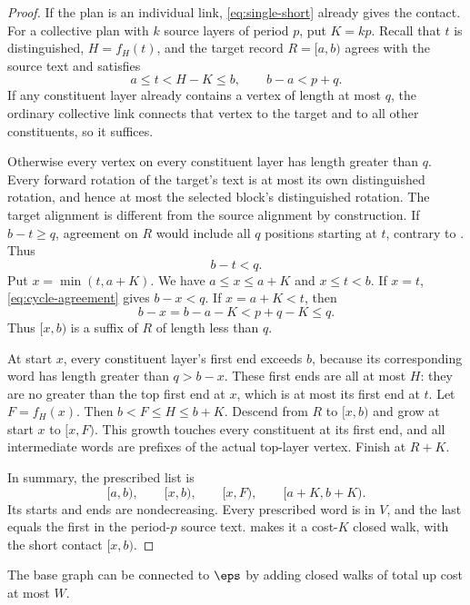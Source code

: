 \begin{proof}
If the plan is an individual link, \eqref{eq:single-short} already gives the contact. For a collective plan with $k$ source layers of period $p$, put $K=kp$. Recall that $t$ is distinguished, $H=f_H(t)$, and the target record $R=[a,b)$ agrees with the source text and satisfies
\[
a\le t<H-K\le b,\qquad b-a<p+q.
\]
If any constituent layer already contains a vertex of length at most $q$, the ordinary collective link connects that vertex to the target and to all other constituents, so it suffices.

Otherwise every vertex on every constituent layer has length greater than $q$. Every forward rotation of the target's text is at most its own distinguished rotation, and hence at most the selected block's distinguished rotation. The target alignment is different from the source alignment by construction. If $b-t\ge q$, agreement on $R$ would include all $q$ positions starting at $t$, contrary to . Thus
\begin{equation}\label{eq:cycle-agreement}
b-t<q.
\end{equation}
Put $x=\min(t,a+K)$. We have $a\le x\le a+K$ and $x\le t<b$. If $x=t$, \eqref{eq:cycle-agreement} gives $b-x<q$. If $x=a+K<t$, then
\[
b-x=b-a-K<p+q-K\le q.
\]
Thus $[x,b)$ is a suffix of $R$ of length less than $q$.

At start $x$, every constituent layer's first end exceeds $b$, because its corresponding word has length greater than $q>b-x$. These first ends are all at most $H$: they are no greater than the top first end at $x$, which is at most its first end at $t$. Let $F=f_H(x)$. Then $b<F\le H\le b+K$. Descend from $R$ to $[x,b)$ and grow at start $x$ to $[x,F)$. This growth touches every constituent at its first end, and all intermediate words are prefixes of the actual top-layer vertex. Finish at $R+K$.

In summary, the prescribed list is
\begin{equation}\label{eq:cycle-list}
[a,b),\qquad[x,b),\qquad[x,F),\qquad[a+K,b+K).
\end{equation}
Its starts and ends are nondecreasing. Every prescribed word is in $V$, and the last equals the first in the period-$p$ source text.  makes it a cost-$K$ closed walk, with the short contact $[x,b)$.
\end{proof}

\begin{theorem}\label{thm:connection}
The base graph can be connected to $\eps$ by adding closed walks of total up cost at most $W$.
\end{theorem}

